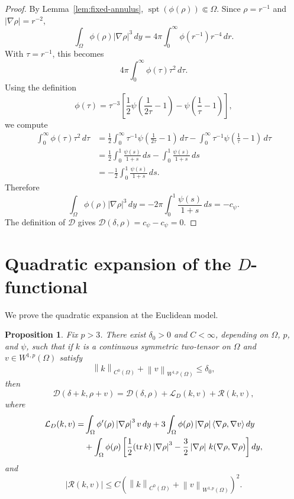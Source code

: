 \documentclass[11pt]{amsart}
\numberwithin{equation}{section}
\newtheorem{proposition}[theorem]{Proposition}
\theoremstyle{definition}
\newcommand{\tr}{\operatorname{tr}}
\newcommand{\spt}{\operatorname{spt}}
\newcommand{\Dfun}{\mathscr D}
\newcommand{\rhoE}{\rho}
\newcommand{\LD}{\mathcal L_D}
\newcommand{\ip}[2]{\langle #1,#2\rangle}
\newcommand{\norm}[1]{\left\lVert #1\right\rVert}
\newcommand{\abs}[1]{\left\lvert #1\right\rvert}
\begin{document}
\begin{proof}
By Lemma~\ref{lem:fixed-annulus}, $\spt(\phi(\rhoE))\Subset\Omega$.  Since $\rhoE=r^{-1}$ and $\abs{\nabla\rhoE}=r^{-2}$,
$$
        \int_\Omega \phi(\rhoE)\abs{\nabla\rhoE}^3\,dy
        =4\pi\int_0^\infty \phi(r^{-1})r^{-4}\,dr.
$$
With $\tau=r^{-1}$, this becomes
$$
        4\pi\int_0^\infty \phi(\tau)\tau^2\,d\tau.
$$
Using the definition
$$
        \phi(\tau)=\tau^{-3}\left[\frac12\psi\left(\frac1{2\tau}-1\right)-\psi\left(\frac1{\tau}-1\right)\right],
$$
we compute
$$
\begin{aligned}
        \int_0^\infty \phi(\tau)\tau^2\,d\tau
        &=\frac12\int_0^\infty \tau^{-1}\psi\left(\frac1{2\tau}-1\right)\,d\tau
          -\int_0^\infty \tau^{-1}\psi\left(\frac1{\tau}-1\right)\,d\tau       \\
        &=\frac12\int_0^1 \frac{\psi(s)}{1+s}\,ds
          -\int_0^1 \frac{\psi(s)}{1+s}\,ds                                  \\
        &=-\frac12\int_0^1 \frac{\psi(s)}{1+s}\,ds.
\end{aligned}
$$
Therefore
$$
        \int_\Omega \phi(\rhoE)\abs{\nabla\rhoE}^3\,dy
        =-2\pi\int_0^1\frac{\psi(s)}{1+s}\,ds=-c_\psi.
$$
The definition of $\Dfun$ gives $\Dfun(\delta,\rhoE)=c_\psi-c_\psi=0$.
\end{proof}

\section{\texorpdfstring{Quadratic expansion of the $D$-functional}{Quadratic expansion of the D-functional}}
\label{sec:D-quadratic}

We prove the quadratic expansion at the Euclidean model.
\begin{proposition}\label{prop:D-quadratic}
Fix $p>3$.  There exist $\delta_0>0$ and $C<\infty$, depending on $\Omega$, $p$, and $\psi$, such that if $k$ is a continuous symmetric two-tensor on $\Omega$ and $v\in W^{1,p}(\Omega)$ satisfy
$$
        \norm{k}_{C^0(\Omega)}+
        \norm{v}_{W^{1,p}(\Omega)}\le\delta_0,
$$
then
\begin{equation}\label{eq:D-quadratic}
        \Dfun(\delta+k,\rhoE+v)
        =\Dfun(\delta,\rhoE)+\LD(k,v)+\mathcal R(k,v),
\end{equation}
where
\begin{align}\label{eq:L-def}
        \LD(k,v)=
        &\int_\Omega\phi'(\rhoE)\abs{\nabla\rhoE}^3v\,dy
        +3\int_\Omega\phi(\rhoE)\abs{\nabla\rhoE}\ip{\nabla\rhoE}{\nabla v}\,dy\notag\\
        &+\int_\Omega\phi(\rhoE)
        \left[\frac12(\tr k)\abs{\nabla\rhoE}^3
        -\frac32\abs{\nabla\rhoE}\,k(\nabla\rhoE,\nabla\rhoE)\right]dy,
\end{align}
and
\begin{equation}\label{eq:D-rem-bound}
        \abs{\mathcal R(k,v)}
        \le C\left(\norm{k}_{C^0(\Omega)}+
        \norm{v}_{W^{1,p}(\Omega)}\right)^2.
\end{equation}
\end{proposition}
\end{document}
